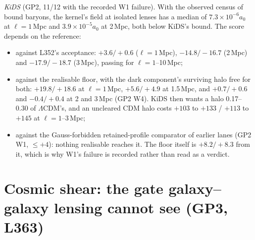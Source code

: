 \documentclass[10pt]{article}
\begin{document}
\emph{KiDS} (GP2, 11/12 with the recorded W1 failure). With the observed census of bound baryons, the kernel's field at isolated lenses has a median of $7.3\times10^{-6}a_0$ at $\ell=1$\,Mpc and $3.9\times10^{-5}a_0$ at 2\,Mpc, both below KiDS's bound. The score depends on the reference:
\begin{itemize}
\item against L352's acceptance: $+3.6/+0.6$ ($\ell=1$\,Mpc), $-14.8/-16.7$ (2\,Mpc) and $-17.9/-18.7$ (3\,Mpc), passing for $\ell=1$--10\,Mpc;
\item against the realisable floor, with the dark component's surviving halo free for both: $+19.8/+18.6$ at $\ell=1$\,Mpc, $+5.6/+4.9$ at 1.5\,Mpc, and $+0.7/+0.6$ and $-0.4/+0.4$ at 2 and 3\,Mpc (GP2 W4). KiDS then wants a halo 0.17--0.30 of $\Lambda$CDM's, and an uncleared CDM halo costs $+103$ to $+133$ / $+113$ to $+145$ at $\ell=1$--3\,Mpc;
\item against the Gauss-forbidden retained-profile comparator of earlier lanes (GP2 W1, $\leq+4$): nothing realisable reaches it. The floor itself is $+8.2/+8.3$ from it, which is why W1's failure is recorded rather than read as a verdict.
\end{itemize}

\section{Cosmic shear: the gate galaxy--galaxy lensing cannot see (GP3, L363)}\label{sec:shear}
\end{document}
